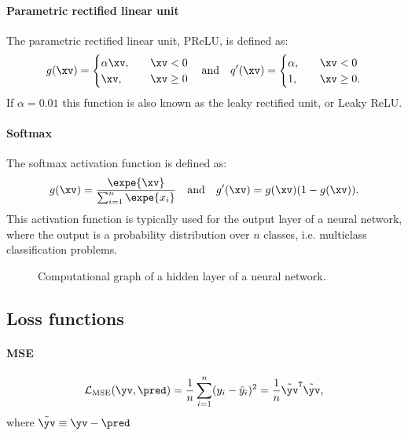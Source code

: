         \paragraph{Parametric rectified linear unit}
            The parametric rectified linear unit, PReLU, is defined as:
            \begin{equation}
                g(\xv) = 
                \begin{cases}
                    \alpha \xv, \quad & \xv<0 \\
                    \xv, \quad & \xv\geq 0
                \end{cases}
                \quad \mathrm{and} \quad
                q'(\xv) = 
                \begin{cases}
                    \alpha, \quad & \xv<0 \\
                    1, \quad & \xv\geq 0.
                \end{cases}
            \end{equation}
            If $\alpha=0.01$ this function is also known as the leaky rectified unit, or Leaky ReLU. 

        \paragraph{Softmax}
            The softmax activation function is defined as:
            \begin{equation}
                g(\xv) = \frac{\expe{\xv}}{\sum_{i=1}^n\expe{x_i}} \quad \mathrm{and} \quad g'(\xv) = g(\xv)(1-g(\xv)).
            \end{equation}
            This activation function is typically used for the output layer of a neural network, where the output is a probability distribution over $n$ classes, i.e. multiclass classification problems. 
        \begin{figure}[h!]
            \centering
            
            \caption{Computational graph of a hidden layer of a neural network.}
            \label{fig:ML:NN:comp_graph_hl}
        \end{figure}
    \subsection{Loss functions}
        \paragraph{MSE}
            \begin{equation}
                \mathcal{L}_\mathrm{MSE}(\yv, \pred) = \frac{1}{n}\sum_{i=1}^n(y_i-\hat{y}_i)^2 = \frac{1}{n}\tilde{\yv}^\mathtt{T}\tilde{\yv},
            \end{equation}
            where $\tilde{\yv} \equiv \yv-\pred$

